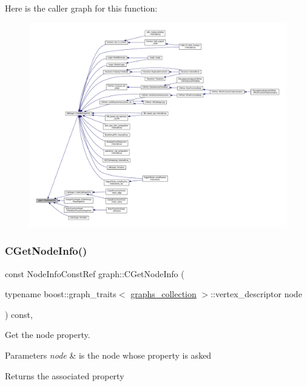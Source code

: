 Here is the caller graph for this function\+:
\nopagebreak
\begin{figure}[H]
\begin{center}
\leavevmode
\includegraphics[width=350pt]{d5/d15/structgraph_a5e08b475b11e2ae0a451c3834a2f2e7b_icgraph}
\end{center}
\end{figure}
\mbox{\label{structgraph_a6dfc893ca9b8dfcad31c8b2267f0b160}} 
\subsubsection{\texorpdfstring{C\+Get\+Node\+Info()}{CGetNodeInfo()}}
{\footnotesize\ttfamily const Node\+Info\+Const\+Ref graph\+::\+C\+Get\+Node\+Info (\begin{DoxyParamCaption}\item[{typename boost\+::graph\+\_\+traits$<$ \hyperlink{structgraphs__collection}{graphs\+\_\+collection} $>$\+::vertex\+\_\+descriptor}]{node }\end{DoxyParamCaption}) const\hspace{0.3cm}{\ttfamily [inline]}, {\ttfamily [protected]}}



Get the node property. 


\begin{DoxyParams}{Parameters}
{\em node} & is the node whose property is asked \\
\hline
\end{DoxyParams}
\begin{DoxyReturn}{Returns}
the associated property 
\end{DoxyReturn}



